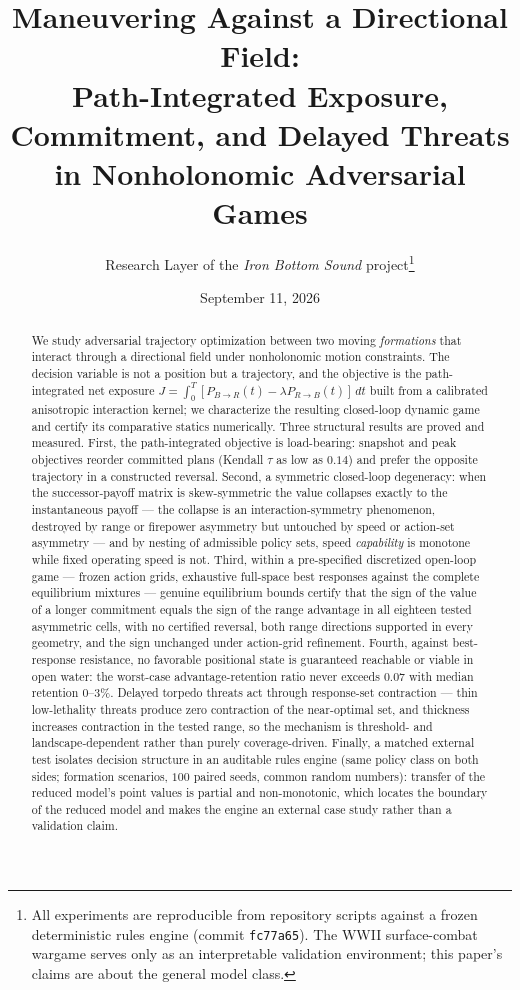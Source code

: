 \documentclass[12pt,a4paper]{article}
\title{Maneuvering Against a Directional Field:\\
Path-Integrated Exposure, Commitment, and Delayed Threats\\
in Nonholonomic Adversarial Games}
\author{Research Layer of the \emph{Iron Bottom Sound} project\thanks{All
experiments are reproducible from repository scripts against a frozen
deterministic rules engine (commit \texttt{fc77a65}).  The WWII surface-combat
wargame serves only as an interpretable validation environment; this paper's
claims are about the general model class.}}
\date{September 11, 2026}
\begin{document}
\maketitle

\begin{abstract}
We study adversarial trajectory optimization between two moving
\emph{formations} that interact through a directional field under
nonholonomic motion constraints.  The decision variable is not a position
but a trajectory, and the objective is the path-integrated net exposure
$J=\int_0^T[P_{B\to R}(t)-\lambda P_{R\to B}(t)]\,dt$ built from a
calibrated anisotropic interaction kernel; we characterize the resulting
closed-loop dynamic game and certify its comparative statics numerically.
Three structural results are proved and measured.  First, the
path-integrated objective is load-bearing: snapshot and peak objectives
reorder committed plans (Kendall $\tau$ as low as $0.14$) and prefer the
opposite trajectory in a constructed reversal.  Second, a symmetric
closed-loop degeneracy: when the successor-payoff matrix is skew-symmetric
the value collapses exactly to the instantaneous payoff --- the collapse is
an interaction-symmetry phenomenon, destroyed by range or firepower
asymmetry but untouched by speed or action-set asymmetry --- and by
nesting of admissible policy sets, speed \emph{capability} is monotone
while fixed operating speed is not.  Third, within a pre-specified discretized
open-loop game --- frozen action grids, exhaustive full-space best
responses against the complete equilibrium mixtures --- genuine
equilibrium bounds certify that the sign of the value of a longer
commitment equals the sign of the range advantage in all eighteen tested
asymmetric cells, with no certified reversal, both range directions
supported in every geometry, and the sign unchanged under action-grid
refinement.  Fourth, against best-response resistance, no favorable
positional state is guaranteed reachable or viable in open water: the
worst-case advantage-retention ratio never exceeds $0.07$ with median
retention $0$--$3\%$.  Delayed torpedo threats act through response-set
contraction --- thin low-lethality threats produce zero contraction of the
near-optimal set, and thickness increases contraction in the tested range,
so the mechanism is threshold- and landscape-dependent rather than purely
coverage-driven.  Finally, a matched external test isolates decision
structure in an auditable rules engine (same policy class on both sides;
formation scenarios, $100$ paired seeds, common random numbers): transfer
of the reduced model's point values is partial and non-monotonic, which
locates the boundary of the reduced model and makes the engine an external
case study rather than a validation claim.
\end{abstract}
\end{document}
